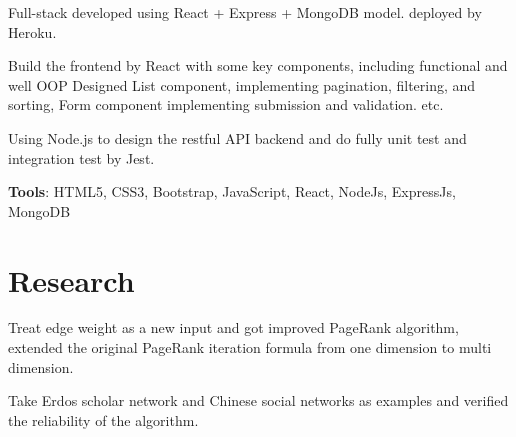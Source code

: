 \documentclass[letterpaper]{deedy-resume} %
\begin{document}
\begin{minipage}[t]{1\textwidth}
\vspace{\topsep} %
\begin{tightitemize}
	\item Full-stack developed using React + Express + MongoDB model.
	deployed by Heroku.
	\item Build the frontend by React with some key components, including functional and well OOP Designed List component, implementing pagination, filtering, and sorting, Form component implementing submission and validation. etc.
	\item Using Node.js to design the restful API backend and do fully unit test and integration test by Jest.
	\item \textbf{Tools}: HTML5, CSS3, Bootstrap, JavaScript, React, NodeJs, ExpressJs, MongoDB
\end{tightitemize}
\section{Research}

\descript{}

\vspace{\topsep} %
\begin{tightitemize}
	\item Treat edge weight as a new input and got improved PageRank algorithm, extended the original PageRank iteration formula from one dimension to multi dimension.
	\item Take Erdos scholar network and Chinese social networks as examples and verified the reliability of the algorithm.
\end{tightitemize}

\end{minipage} %

\end{document}
